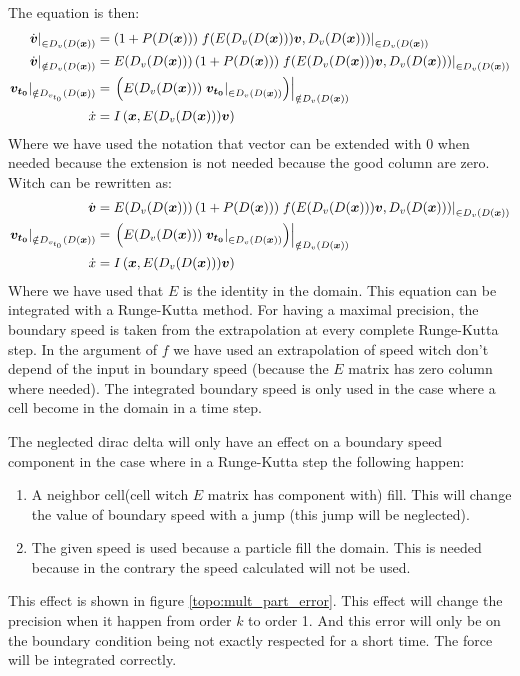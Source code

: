 The equation is then:
\begin{align}
	\left.\dot{{\boldsymbol {v}}}\right|_{\in D_{v}(D({\boldsymbol {x}}))}&=\left(1+P(D({\boldsymbol {x}}))\right)\left.f(E(D_v(D({\boldsymbol {x}}))){\boldsymbol {v}},D_{v}(D({\boldsymbol {x}})))\right|_{\in D_{v}(D({\boldsymbol {x}}))}\\
	\left.\dot{{\boldsymbol {v}}}\right|_{\notin D_{v}(D({\boldsymbol {x}}))}&=E(D_v(D({\boldsymbol {x}})))\left(1+P(D({\boldsymbol {x}}))\right)\left.f(E(D_v(D({\boldsymbol {x}}))){\boldsymbol {v}},D_{v}(D({\boldsymbol {x}})))\right|_{\in D_{v}(D({\boldsymbol {x}}))}\\
	\left.{\boldsymbol {v_{t_0}}}\right|_{\notin D_{v_{t_0}}(D({\boldsymbol {x}}))}&=\left.\left(E(D_v(D({\boldsymbol {x}})))\left.{\boldsymbol {v_{t_0}}}\right|_{\in D_{v}(D({\boldsymbol {x}}))}\right)\right|_{\notin D_{v}(D({\boldsymbol {x}}))}\\
	\dot{x}&=I\left({\boldsymbol {x}},E(D_v(D({\boldsymbol {x}}))){\boldsymbol {v}}\right)\\
\end{align}
Where we have used the notation that vector can be extended with 0 when needed because the extension is not needed because the good column are zero.
Witch can be rewritten as:
\begin{align}\label{topo:equ:onediff}
	\dot{{\boldsymbol {v}}}&=E(D_v(D({\boldsymbol {x}})))\left(1+P(D({\boldsymbol {x}}))\right)\left.f(E(D_v(D({\boldsymbol {x}}))){\boldsymbol {v}},D_{v}(D({\boldsymbol {x}})))\right|_{\in D_{v}(D({\boldsymbol {x}}))}\\
	\left.{\boldsymbol {v_{t_0}}}\right|_{\notin D_{v_{t_0}}(D({\boldsymbol {x}}))}&=\left.\left(E(D_v(D({\boldsymbol {x}})))\left.{\boldsymbol {v_{t_0}}}\right|_{\in D_{v}(D({\boldsymbol {x}}))}\right)\right|_{\notin D_{v}(D({\boldsymbol {x}}))}\\
	\dot{x}&=I\left({\boldsymbol {x}},E(D_v(D({\boldsymbol {x}}))){\boldsymbol {v}}\right)\\
\end{align}
Where we have used that $E$ is the identity in the domain.
This equation can be integrated with a Runge-Kutta method.
For having a maximal precision, the boundary speed is taken from the extrapolation at every complete Runge-Kutta step.
In the argument of $f$ we have used an extrapolation of speed witch don't depend of the input in boundary speed (because the $E$ matrix has zero column where needed).
The integrated boundary speed is only used in the case where a cell become in the domain in a time step.

The neglected dirac delta will only have an effect on a boundary speed component in the case where in a Runge-Kutta step the following happen:
\begin{enumerate}
	\item A neighbor cell(cell witch $E$ matrix has component with) fill.
	This will change the value of boundary speed with a jump (this jump will be neglected).
	\item The given speed is used because a particle fill the domain.
	This is needed because in the contrary the speed calculated will not be used.
\end{enumerate}
This effect is shown in figure \ref{topo:mult_part_error}.
This effect will change the precision when it happen from order $k$ to order 1.
And this error will only be on the boundary condition being not exactly respected for a short time.
The force will be integrated correctly.

